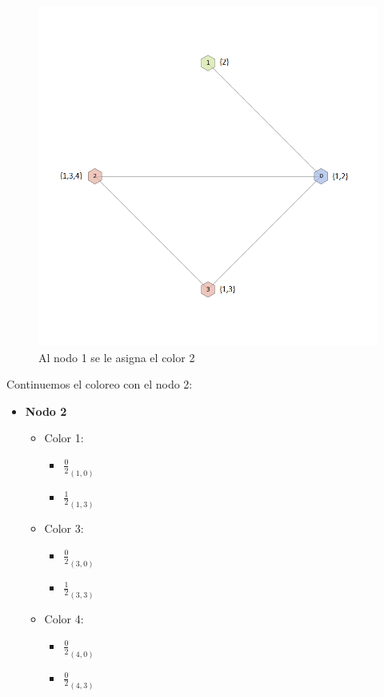  \begin{figure}[H]
    \begin{center}
  	\includegraphics[width=13cm]{imagenes/Ej3/4Nodos2.png}
 	\caption{Al nodo 1 se le asigna el color 2}
 	\label{2colores}
    \end{center}
  \end{figure}

Continuemos el coloreo con el nodo 2: \\

\begin{itemize}
	\item \textbf{Nodo 2}
	\begin{itemize}
		\item Color 1:
		\begin{itemize}
			\item  $\frac{0}{2}_{(1,0)}$
			\item  $\frac{1}{2}_{(1,3)}$
		\end{itemize}

		\item Color 3:
		\begin{itemize}
			\item  $\frac{0}{2}_{(3,0)}$
			\item  $\frac{1}{2}_{(3,3)}$
		\end{itemize}

		\item Color 4:
		\begin{itemize}
			\item  $\frac{0}{2}_{(4,0)}$
			\item  $\frac{0}{2}_{(4,3)}$
		\end{itemize}
	\end{itemize}
\end{itemize}

